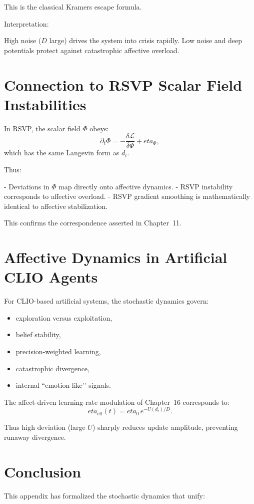 \documentclass[12pt,oneside]{book}
\theoremstyle{plain}
\theoremstyle{definition}
\def\eta{eta}%
\begin{document}
This is the classical Kramers escape formula.

Interpretation:

High noise ($D$ large) drives the system into crisis rapidly.
Low noise and deep potentials protect against catastrophic affective overload.

\section{Connection to RSVP Scalar Field Instabilities}

In RSVP, the scalar field $\Phi$ obeys:
\[
\partial_t \Phi = -\frac{\delta \mathcal{L}}{\delta \Phi} + \eta_\Phi,
\]
which has the same Langevin form as $d_t$.

Thus:

- Deviations in $\Phi$ map directly onto affective dynamics.
- RSVP instability corresponds to affective overload.
- RSVP gradient smoothing is mathematically identical to affective stabilization.

This confirms the correspondence asserted in Chapter~11.

\section{Affective Dynamics in Artificial CLIO Agents}

For CLIO-based artificial systems,
the stochastic dynamics govern:

\begin{itemize}
    \item exploration versus exploitation,
    \item belief stability,
    \item precision-weighted learning,
    \item catastrophic divergence,
    \item internal ``emotion-like’’ signals.
\end{itemize}

The affect-driven learning-rate modulation of Chapter~16 corresponds to:
\[
\eta_\text{eff}(t)
=
\eta_0\, e^{-U(d_t)/D}.
\]

Thus high deviation (large $U$) sharply reduces update amplitude,
preventing runaway divergence.

\section{Conclusion}

This appendix has formalized the stochastic dynamics that unify:
\end{document}
